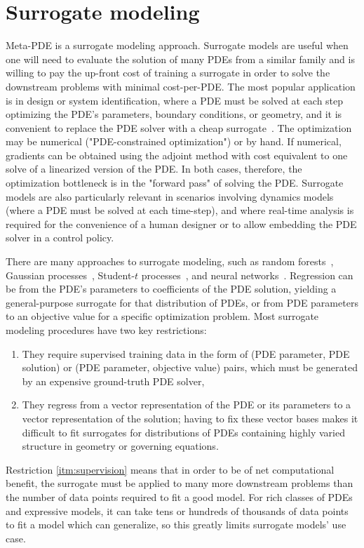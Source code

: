 \section{Surrogate modeling}
Meta-PDE is a surrogate modeling approach.
Surrogate models are useful when one will need to evaluate the solution of many
PDEs from a similar family and is willing to pay the up-front cost of training a
surrogate in order to solve the downstream problems with minimal cost-per-PDE.
The most popular application is in design or system identification, where a PDE
must be solved at each step optimizing the PDE's parameters, boundary conditions, or geometry,
and it is convenient to replace the PDE solver with a cheap surrogate~\citep{kochenderfer2019algorithms}.
The optimization may be numerical ("PDE-constrained optimization") or by hand.
If numerical, gradients can be obtained using the adjoint method with cost equivalent
to one solve of a linearized version of the PDE.
In both cases, therefore, the optimization bottleneck is in the "forward pass" of solving the PDE.
Surrogate models are also particularly relevant in scenarios involving dynamics models
(where a PDE must be solved at each time-step),
and where real-time analysis is required for the convenience of a human designer or
to allow embedding the PDE solver in a control policy.

There are many approaches to surrogate modeling, such as
random forests~\citep{criminisi2011decision},
Gaussian processes~\citep{shahriari2015taking},
Student-$t$ processes~\citep{shah2014student},
and neural networks~\citep{snoek2015scalable}.
Regression can be from the PDE's parameters to coefficients of the PDE solution,
yielding a general-purpose surrogate for that distribution of PDEs, or from
PDE parameters to an objective value for a specific optimization problem.
Most surrogate modeling procedures have two key restrictions:
\begin{enumerate}
  \item They require supervised training data in the form of
  (PDE parameter, PDE solution) or (PDE parameter, objective value) pairs,
  which must be generated by an expensive ground-truth PDE solver, \label{itm:supervision}
  \item They regress from a vector representation of the PDE or its parameters to a
  vector representation of the solution; having to fix these vector bases
  makes it difficult to fit surrogates for
  distributions of PDEs containing highly varied structure in geometry or governing
  equations.\label{itm:structure}
\end{enumerate}
Restriction \ref{itm:supervision} means that in order to be of net computational benefit,
the surrogate must be applied to many more downstream problems than the number of
data points required to fit a good model. For rich classes of PDEs and expressive models,
it can take tens or hundreds of thousands of data points to fit a model which can generalize,
so this greatly limits surrogate models' use case.

